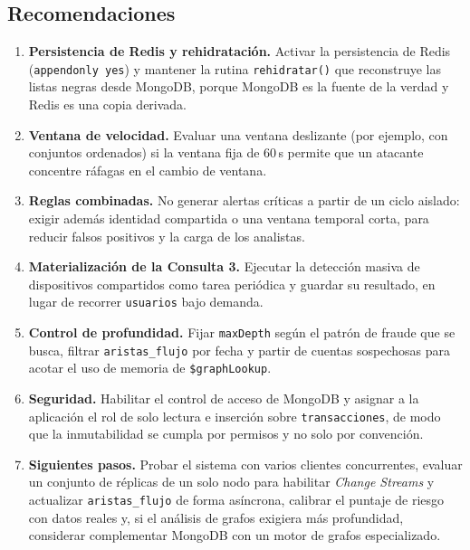 \documentclass[11pt,a4paper]{article}
\begin{document}
	\subsection{Recomendaciones}
	\begin{enumerate}[leftmargin=2em]
		\item \textbf{Persistencia de Redis y rehidratación.} Activar la persistencia de Redis (\texttt{appendonly yes}) y mantener la rutina \texttt{rehidratar()} que reconstruye las listas negras desde MongoDB, porque MongoDB es la fuente de la verdad y Redis es una copia derivada.
		\item \textbf{Ventana de velocidad.} Evaluar una ventana deslizante (por ejemplo, con conjuntos ordenados) si la ventana fija de 60\,s permite que un atacante concentre ráfagas en el cambio de ventana.
		\item \textbf{Reglas combinadas.} No generar alertas críticas a partir de un ciclo aislado: exigir además identidad compartida o una ventana temporal corta, para reducir falsos positivos y la carga de los analistas.
		\item \textbf{Materialización de la Consulta 3.} Ejecutar la detección masiva de dispositivos compartidos como tarea periódica y guardar su resultado, en lugar de recorrer \texttt{usuarios} bajo demanda.
		\item \textbf{Control de profundidad.} Fijar \texttt{maxDepth} según el patrón de fraude que se busca, filtrar \texttt{aristas\_flujo} por fecha y partir de cuentas sospechosas para acotar el uso de memoria de \texttt{\$graphLookup}.
		\item \textbf{Seguridad.} Habilitar el control de acceso de MongoDB y asignar a la aplicación el rol de solo lectura e inserción sobre \texttt{transacciones}, de modo que la inmutabilidad se cumpla por permisos y no solo por convención.
		\item \textbf{Siguientes pasos.} Probar el sistema con varios clientes concurrentes, evaluar un conjunto de réplicas de un solo nodo para habilitar \textit{Change Streams} y actualizar \texttt{aristas\_flujo} de forma asíncrona, calibrar el puntaje de riesgo con datos reales y, si el análisis de grafos exigiera más profundidad, considerar complementar MongoDB con un motor de grafos especializado.
	\end{enumerate}
	
\end{document}
